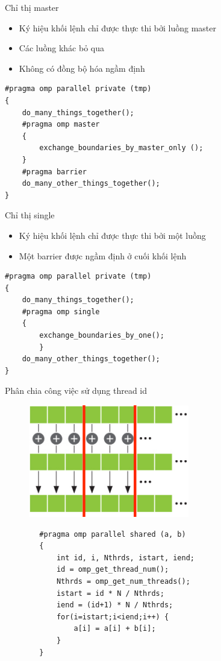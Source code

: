 \documentclass[10pt]{beamer}
\theoremstyle{remark}
\numberwithin{algocf}{section}
\numberwithin{equation}{section}
\numberwithin{dl}{section}
\numberwithin{figure}{section}
\begin{document}
\begin{frame}[fragile]{Chỉ thị master}
    \begin{itemize}
        \item Ký hiệu khối lệnh chỉ được thực thi bởi luồng master
        \item Các luồng khác bỏ qua
        \item Không có đồng bộ hóa ngầm định
    \end{itemize}
    \begin{verbatim}
#pragma omp parallel private (tmp)
{
    do_many_things_together();
    #pragma omp master
    { 
        exchange_boundaries_by_master_only (); 
    }
    #pragma barrier
    do_many_other_things_together();
} 
    \end{verbatim}
\end{frame}

\begin{frame}[fragile]{Chỉ thị single}
    \begin{itemize}
        \item Ký hiệu khối lệnh chỉ được thực thi bởi một luồng
        \item Một barrier được ngầm định ở cuối khối lệnh
    \end{itemize}
    \begin{verbatim}
#pragma omp parallel private (tmp)
{
    do_many_things_together();
    #pragma omp single
    { 
        exchange_boundaries_by_one(); 
        }
    do_many_other_things_together();
}
    \end{verbatim}
\end{frame}

\begin{frame}[fragile]{Phân chia công việc sử dụng thread id}
    \begin{figure}[H]
        \centering
        \includegraphics[width=0.3\linewidth]{figures/OpenMP/Distribute.png}
    \end{figure}
    \begin{verbatim}
        #pragma omp parallel shared (a, b)
        {
            int id, i, Nthrds, istart, iend;
            id = omp_get_thread_num();
            Nthrds = omp_get_num_threads();
            istart = id * N / Nthrds;
            iend = (id+1) * N / Nthrds;
            for(i=istart;i<iend;i++) { 
                a[i] = a[i] + b[i]; 
            }
        } 
    \end{verbatim}
\end{frame}
\end{document}
